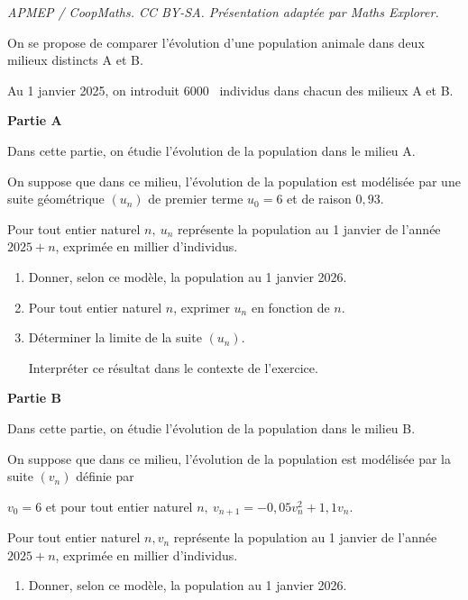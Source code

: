 \documentclass[10pt]{article}
\providecommand{\np}[2][]{{#2~#1}}
\begin{document}
\noindent\textit{APMEP / CoopMaths. CC BY-SA. Présentation adaptée par Maths Explorer.}\par\medskip
On se propose de comparer l'évolution d'une population animale dans deux milieux distincts A et B.

Au 1 janvier 2025, on introduit \np{6000} individus dans chacun des milieux A et B.

\medskip

\textbf{Partie A}

\medskip

Dans cette partie, on étudie l'évolution de la population dans le milieu A.

On suppose que dans ce milieu, l'évolution de la population est modélisée par une suite géométrique $(u_n)$ de premier terme $u_0 = 6$ et de raison $0,93$.

Pour tout entier naturel $n,\: u_n$ représente la population au 1 janvier de l'année $2025+n$, exprimée en millier d'individus.

\medskip

\begin{enumerate}
\item Donner, selon ce modèle, la population au 1 janvier 2026.
\item Pour tout entier naturel $n$, exprimer $u_n$ en fonction de $n$.
\item Déterminer la limite de la suite $(u_n)$.

Interpréter ce résultat dans le contexte de l'exercice.
\end{enumerate}

\medskip

\textbf{Partie B}

\medskip

Dans cette partie, on étudie l'évolution de la population dans le milieu B.

On suppose que dans ce milieu, l'évolution de la population est modélisée par la suite $(v_n)$ définie par 

\begin{center}$v_0 = 6$ et pour tout entier naturel $n,\: v_{n+1} = -0,05v_n^2 +1,1v_n$.\end{center}

Pour tout entier naturel $n, v_n$ représente la population au 1 janvier de l'année $2025 + n$, exprimée en millier d'individus.

\medskip

\begin{enumerate}
\item Donner, selon ce modèle, la population au 1 janvier 2026.
\end{enumerate}
\end{document}
